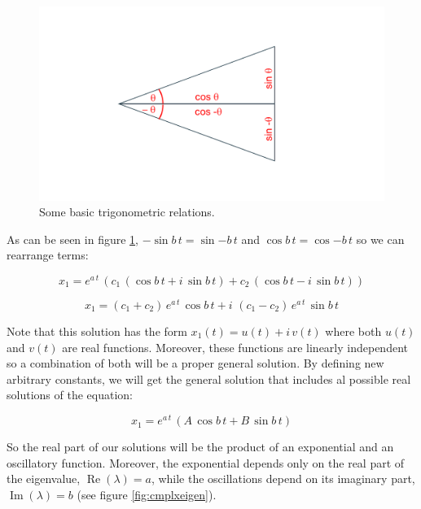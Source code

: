 \documentclass[12pt]{article}
\begin{document}
\begin{figure}
\begin{center}
	\includegraphics[width=\textwidth]{trigo}
\end{center}
\caption{Some basic trigonometric relations.}
\label{fig:trigo}
\end{figure}

As can be seen in  figure \ref{fig:trigo}, $- \sin{b \, t}=\sin{- b \, t}$ and $\cos{b \, t}=\cos{ - b \, t}$ so we can rearrange terms:

\begin{equation}
	x_1= e^{a \, t} \,  \left( c_1  \, \left(  \cos{ b \, t} + i \, \sin{ b \, t} \right)+ c_2 \, \left( \cos{ b \, t} - i \, \sin{ b \, t} \right) \right) \nonumber
\end{equation}


\begin{equation}
	x_1=   \left( c_1+c_2\right) \, e^{a \, t} \, \cos{ b \, t}  + i \, \,\left( c_1-c_2 \right) \,e^{a \, t} \,   \sin{ b \, t}   \nonumber
\end{equation}

Note that this solution has the form $x_1(t) = u(t) + i \, v(t)$ where both $u(t)$ and $v(t)$ are real functions. Moreover, these functions are linearly independent so a combination of both will be a proper general solution. By defining new arbitrary constants, we will get the general solution that includes al possible real solutions of the equation:

\begin{equation}
	x_1=   e^{a \, t} \,  \left(  A  \, \cos{ b \, t}  +  B  \,   \sin{ b \, t}  \right) \nonumber
\end{equation}

So the real part of our solutions will be the product of an exponential and an oscillatory function. Moreover, the exponential depends only on the real part of the eigenvalue, $\operatorname{Re}(\lambda) = a$, while the oscillations depend on its imaginary part,  $\operatorname{Im}(\lambda) =b$ (see figure \ref{fig:cmplxeigen}). 
\end{document}
